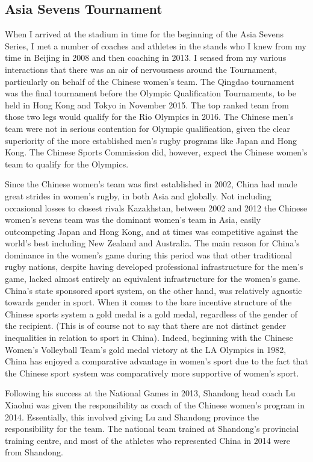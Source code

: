 \begin{CJK}{UTF8}{gbsn}
\subsection{Asia Sevens Tournament}
When I arrived at the stadium in time for the beginning of the Asia Sevens Series, I met a number of coaches and athletes in the stands who I knew from my time in Beijing in 2008 and then coaching in 2013. I sensed from my various interactions that there was an air of nervousness around the Tournament, particularly on behalf of the Chinese women's team.   The Qingdao tournament was the final tournament before the Olympic Qualification Tournaments, to be held in Hong Kong and Tokyo in November 2015.  The top ranked team from those two legs would qualify for the Rio Olympics in 2016.  The Chinese men's team were not in serious contention for Olympic qualification, given the clear superiority of the more established men's rugby programs like Japan and Hong Kong. The Chinese Sports Commission did, however, expect the Chinese women's team to qualify for the Olympics.

Since the Chinese women's team was first established in 2002, China had made great strides in women's rugby, in both Asia and globally.  Not including occasional losses to closest rivals Kazakhstan, between 2002 and 2012 the Chinese women's sevens team was the dominant women's team in Asia, easily outcompeting Japan and Hong Kong, and at times was competitive against the world's best including New Zealand and Australia.  The main reason for China's dominance in the women's game during this period was that other traditional rugby nations, despite having developed professional infrastructure for the men's game, lacked almost entirely an equivalent infrastructure for the women's game. China's state sponsored sport system, on the other hand, was relatively agnostic towards gender in sport. When it comes to the bare incentive structure of the Chinese sports system a gold medal is a gold medal, regardless of the gender of the recipient. (This is of course not to say that there are not distinct gender inequalities in relation to sport in China).  Indeed, beginning with the Chinese Women's Volleyball Team's gold medal victory at the LA Olympics in 1982, China has enjoyed a comparative advantage in women's sport due to the fact that the Chinese sport system was comparatively more supportive of women's sport.

Following his success at the National Games in 2013, Shandong head coach Lu Xiaohui was given the responsibility as coach of the Chinese women's program in 2014.  Essentially, this involved giving Lu and  Shandong province the responsibility for the team.  The national team trained at Shandong's provincial training centre, and most of the athletes who represented China in 2014 were from Shandong.


\end{CJK}
